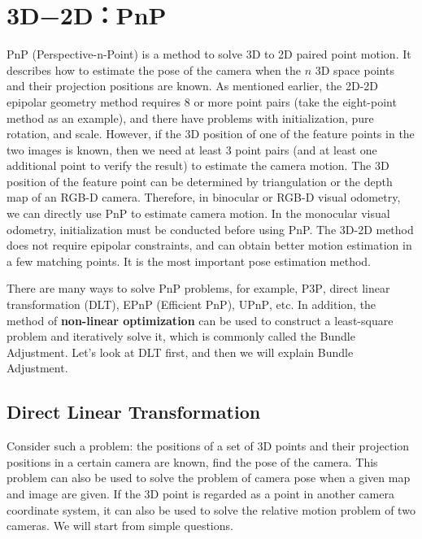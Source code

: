 \section{3D−2D：PnP}
PnP (Perspective-n-Point) is a method to solve 3D to 2D paired point motion. It describes how to estimate the pose of the camera when the $n$ 3D space points and their projection positions are known. As mentioned earlier, the 2D-2D epipolar geometry method requires 8 or more point pairs (take the eight-point method as an example), and there have problems with initialization, pure rotation, and scale. However, if the 3D position of one of the feature points in the two images is known, then we need at least 3 point pairs (and at least one additional point to verify the result) to estimate the camera motion. The 3D position of the feature point can be determined by triangulation or the depth map of an RGB-D camera. Therefore, in binocular or RGB-D visual odometry, we can directly use PnP to estimate camera motion. In the monocular visual odometry, initialization must be conducted before using PnP. The 3D-2D method does not require epipolar constraints, and can obtain better motion estimation in a few matching points. It is the most important pose estimation method.

There are many ways to solve PnP problems, for example, P3P\textsuperscript{\cite{GaoHouTangEtAl2003}}, direct linear transformation (DLT), EPnP (Efficient PnP)\textsuperscript{\cite{LepetitMoreno-NoguerFua2008 }}, UPnP\textsuperscript{\cite{Penate-SanchezAndrade-CettoMoreno-Noguer2013}}, etc. In addition, the method of \textbf{non-linear optimization} can be used to construct a least-square problem and iteratively solve it, which is commonly called the Bundle Adjustment. Let's look at DLT first, and then we will explain Bundle Adjustment.

\subsection{Direct Linear Transformation}
Consider such a problem: the positions of a set of 3D points and their projection positions in a certain camera are known, find the pose of the camera. This problem can also be used to solve the problem of camera pose when a given map and image are given. If the 3D point is regarded as a point in another camera coordinate system, it can also be used to solve the relative motion problem of two cameras. We will start from simple questions.

